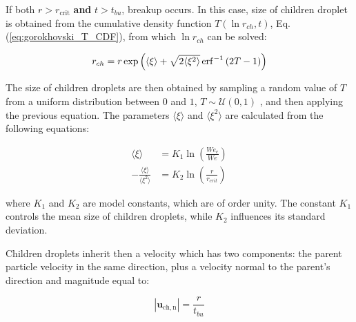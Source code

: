 If both $r > r_\mathrm{crit}$ \textbf{and} $t > t_{bu}$, breakup occurs. In this case, size of children droplet is obtained from the cumulative density function $T \left( \ln r_{ch}, t \right)$, Eq. (\ref{eq:gorokhovski_T_CDF}), from which $\ln r_{ch}$ can be solved:
 
 
\begin{equation}
r_{ch} = r \exp \left( \langle \xi \rangle  + \sqrt{2 \langle \xi^2 \rangle} \operatorname{erf}^{-1} \left(  2 T - 1 \right) \right)
\end{equation}


The size of children droplets are then obtained by sampling a random value of $T$ from a uniform distribution between $0$ and $1$, $T \sim \mathcal{U} \left( 0, 1 \right)$ , and then applying the previous equation. The parameters $\langle \xi \rangle$ and $\langle \xi^2 \rangle$ are calculated from the following equations:

\begin{subequations}
\label{eq:gorokhovski_epsilon_parameters_definition}
\begin{align}
\langle \xi \rangle &=  K_1 \ln \left(  \frac{We_c}{We}  \right) \\
- \frac{\langle \xi \rangle}{\langle \xi^2 \rangle} &=  K_2 \ln \left( \frac{r}{r_{crit}} \right)
\end{align}
\end{subequations}

where $K_1$ and $K_2$ are model constants, which are of order unity. The constant $K_1$ controls the mean size of children droplets, while $K_2$ influences its standard deviation.

Children droplets inherit then a velocity which has two components: the parent particle velocity in the same direction, plus a velocity normal to the parent's direction and magnitude equal to:

\begin{equation}
|\textbf{u}_\mathrm{ch,n} | = \frac{r}{t_{bu}}
\end{equation}





